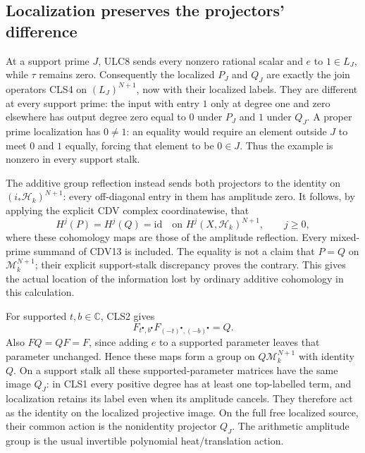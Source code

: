 \subsection{Localization preserves the projectors' difference}
At a support prime $J$, ULC8 sends every nonzero rational scalar
and $e$ to $1\in L_J$, while $\tau$ remains zero. Consequently
the localized $P_J$ and $Q_J$ are exactly the join operators CLS4
on $(L_J)^{N+1}$, now with their localized labels. They are
different at every support prime: the input with entry $1$ only
at degree one and zero elsewhere has output degree zero equal
to $0$ under $P_J$ and $1$ under $Q_J$. A proper prime localization
has $0\ne1$: an equality would require an element outside $J$
to meet $0$ and $1$ equally, forcing that element to be $0\in J$.
Thus the example is nonzero in every support stalk.

The additive group reflection instead sends both projectors to
the identity on $(i_*\mathcal H_k)^{N+1}$: every off-diagonal
entry in them has amplitude zero. It follows, by applying the
explicit CDV complex coordinatewise, that
\begin{equation}\tag{CLS5}
 H^j(P)=H^j(Q)=\mathrm{id}\quad\text{on }
 H^j(X,\mathcal H_k)^{N+1},\qquad j\ge0,
\end{equation}
where these cohomology maps are those of the amplitude reflection.
Every mixed-prime summand of CDV13 is included. The equality is
not a claim that $P=Q$ on $\mathcal M_k^{N+1}$; their explicit
support-stalk discrepancy proves the contrary. This gives the
actual location of the information lost by ordinary additive
cohomology in this calculation.

For supported $t,b\in\mathbb C$, CLS2 gives
\begin{equation}\tag{CLS6}
 F_{t^\bullet,b^\bullet}F_{(-t)^\bullet,(-b)^\bullet}=Q.
\end{equation}
Also $FQ=QF=F$, since adding $e$ to a supported parameter leaves
that parameter unchanged. Hence these maps form a group on
$Q\mathcal M_k^{N+1}$ with identity $Q$. On a support stalk all
these supported-parameter matrices have the same image $Q_J$:
in CLS1 every positive degree has at least one top-labelled term,
and localization retains its label even when its amplitude cancels.
They therefore act as the identity on the localized projective image.
On the full free localized source, their common action is the
nonidentity projector $Q_J$. The arithmetic amplitude group is the
usual invertible polynomial heat/translation action.

